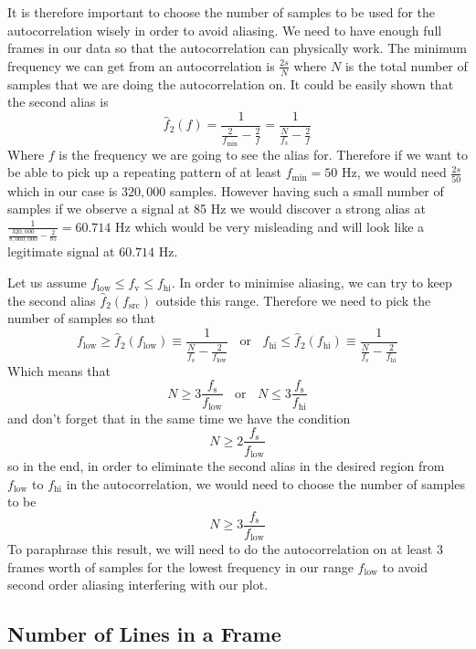 \documentclass[a4paper,12pt,twoside,openright]{report}
\begin{document}
It is therefore important to choose the number of samples to be used for the autocorrelation wisely in order to avoid aliasing. We need to have enough full frames in our data so that the autocorrelation can physically work. The minimum frequency we can get from an autocorrelation is $\frac{2 s}{N}$ where $N$ is the total number of samples that we are doing the autocorrelation on. It could be easily shown that the second alias is
\begin{equation}
\hat{f}_{2}(f) = \frac{1}{\frac{2}{f_\text{min}}-\frac{2}{f}} = \frac{1}{\frac{N}{f_\text{s}}-\frac{2}{f}}
\end{equation}
Where $f$ is the frequency we are going to see the alias for. Therefore if we want to be able to pick up a repeating pattern of at least $f_\text{min} = 50$ Hz, we would need $\frac{2 s}{50}$ which in our case is $320,000$ samples. However having such a small number of samples if we observe a signal at 85 Hz we would discover a strong alias at $\frac{1}{\frac{320,000}{8,000,000}-\frac{2}{85} } = 60.714$ Hz which would be very misleading and will look like a legitimate signal at $60.714$ Hz. 

Let us assume $f_\text{low} \leq f_\text{v} \leq f_\text{hi}$. In order to minimise aliasing, we can try to keep the second alias $\hat{f}_{2}(f_\text{src})$ outside this range. Therefore we need to pick the number of samples so that
$$f_\text{low} \geq \hat{f}_{2}(f_\text{low}) \equiv \frac{1}{\frac{N}{f_\text{s}}-\frac{2}{f_\text{low}}}  \,\,\,\,\ \text{or} \,\,\,\,\ f_\text{hi} \leq \hat{f}_{2}(f_\text{hi}) \equiv \frac{1}{\frac{N}{f_\text{s}}-\frac{2}{f_\text{hi}}}  $$
Which means that
$$ N \geq 3 \frac{f_\text{s}}{f_\text{low}} \,\,\,\,\ \text{or} \,\,\,\,\ N \leq 3 \frac{f_\text{s}}{f_\text{hi}} $$
and don't forget that in the same time we have the condition
$$N \geq 2 \frac{f_\text{s}}{f_\text{low}}$$
so in the end, in order to eliminate the second alias in the desired region from $f_\text{low}$ to $f_\text{hi}$ in the autocorrelation, we would need to choose the number of samples to be
\begin{equation}
\label{eq:autocorraliasingcondition}
N \geq 3 \frac{f_\text{s}}{f_\text{low}}
\end{equation}
To paraphrase this result, we will need to do the autocorrelation on at least 3 frames worth of samples for the lowest frequency in our range $f_\text{low}$ to avoid second order aliasing interfering with our plot.

\subsection{Number of Lines in a Frame}
\end{document}
